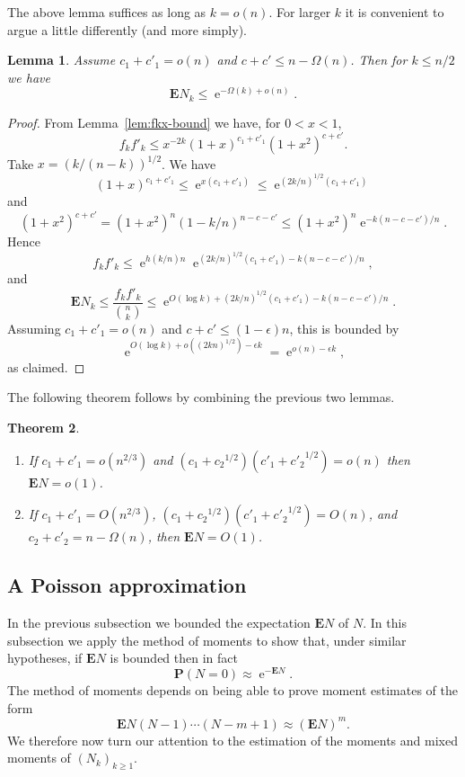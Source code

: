 \documentclass[10pt,a4paper]{amsart}
\newtheorem{theorem}{Theorem}[section]
\newtheorem{lemma}[theorem]{Lemma}
\theoremstyle{remark}
\DeclareMathOperator{\expe}{e}
\newcommand{\eps}{\epsilon}
\renewcommand\P{\mathbf{P}}
\newcommand\E{\mathbf{E}}
\begin{document}
The above lemma suffices as long as $k = o(n)$. For larger $k$ it is convenient to argue a little differently (and more simply).

\begin{lemma} \label{lem:Nk-bound-large-k}
Assume $c_1 + c'_1 = o(n)$ and $c+c' \leq n - \Omega(n)$. Then for $k\leq n/2$ we have
\[
 \E N_k \leq \expe^{-\Omega(k) + o(n)}.
\]
\end{lemma}
\begin{proof}
From Lemma~\ref{lem:fkx-bound} we have, for $0 < x < 1$,
\[
 f_k f'_k \leq x^{-2k} (1+x)^{c_1 + c'_1} (1+x^2)^{c + c'}.
\]
Take $x = (k/(n-k))^{1/2}$. We have
\[
 (1+x)^{c_1 + c'_1} \leq \expe^{x(c_1 + c'_1)} \leq \expe^{(2k/n)^{1/2} (c_1 + c'_1)}
\]
and
\[
 (1+x^2)^{c+c'} = (1+x^2)^n (1-k/n)^{n - c - c'} \leq (1+x^2)^n \expe^{-k(n - c- c')/n}.
\]
Hence
\[
 f_k f'_k \leq \expe^{h(k/n)n} \expe^{(2k/n)^{1/2}(c_1 + c'_1) - k(n-c-c')/n},
\]
and
\[
 \E N_k \leq \frac{f_k f'_k}{\binom{n}{k}} \leq \expe^{O(\log k) + (2k/n)^{1/2} (c_1 + c'_1) - k(n-c-c')/n}.
\]
Assuming $c_1+c'_1 = o(n)$ and $c + c' \leq (1-\eps) n$, this is bounded by
\[
 \expe^{O(\log k) + o((2k n)^{1/2}) - \eps k} = \expe^{o(n) - \eps k},
\]
as claimed.
\end{proof}

The following theorem follows by combining the previous two lemmas.

\begin{theorem} \label{thm:main-ENk-bound}
$\ $
\begin{enumerate}
 \item If $c_1 + c'_1 = o(n^{2/3})$ and $(c_1 + {c_2}^{1/2}) (c'_1 + {c'_2}^{1/2}) = o(n)$ then $\E N = o(1)$.
 \item If $c_1 + c'_1 = O(n^{2/3})$, $(c_1 + {c_2}^{1/2}) (c'_1 + {c'_2}^{1/2}) = O(n)$, and $c_2 + c'_2 = n - \Omega(n)$, then $\E N = O(1)$.
\end{enumerate}
\end{theorem}

\subsection{A Poisson approximation} \label{subsec:possion}

In the previous subsection we bounded the expectation $\E N$ of $N$. In this subsection we apply the method of moments to show that, under similar hypotheses, if $\E N$ is bounded then in fact
\[
 \P(N = 0) \approx \expe^{-\E N}.
\]
The method of moments depends on being able to prove moment estimates of the form
\[
 \E N(N-1) \cdots (N-m+1) \approx (\E N)^m.
\]
We therefore now turn our attention to the estimation of the moments and mixed moments of $(N_k)_{k\geq 1}$.
\end{document}
